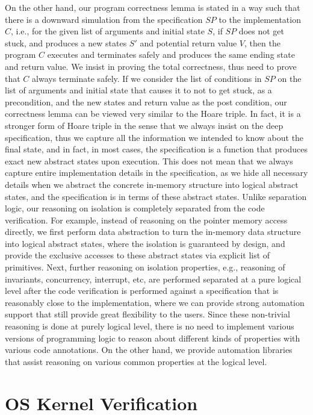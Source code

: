 On the other hand, our program correctness lemma is stated in a way such that there is a downward simulation from the specification $SP$
to the implementation $C$, i.e., for the given list of arguments and initial state $S$, if $SP$ does not get stuck, and produces a new 
states $S'$ and potential return value $V$, then the program $C$ executes and terminates safely and produces the same ending state and return value.
We insist in proving the total correctness, thus need to prove that $C$ always terminate safely.
If we consider the list of conditions in $SP$ on the list of arguments and initial state that causes it to not to get stuck, as a precondition,
and the new states and return value as the post condition, our correctness lemma can be viewed very similar to the Hoare triple.
In fact, it is a stronger form of Hoare triple in the sense that we always insist on the deep specification, thus we capture all the information
we intended to know about the final state, and in fact, in most cases, the specification is a function that produces exact new abstract states upon 
execution. This does not mean that we always capture entire implementation details in the specification, as we hide all necessary details
when we abstract the concrete in-memory structure into logical abstract states, and the specification is in terms of these abstract states.
Unlike separation logic, our reasoning on isolation is completely separated from the code verification. For example, instead of reasoning
on the pointer memory access directly, we first perform data abstraction to turn the in-memory data structure into logical abstract states,
where the isolation is guaranteed by design, and provide the exclusive accesses to these abstract states via explicit list of primitives.
Next, further reasoning on isolation properties, e.g., reasoning of invariants, concurrency, interrupt, etc, are performed separated
at a pure logical level after the code verification is performed against a specification that is reasonably close to the implementation,
where we can provide strong automation support that still provide great flexibility to the users.
Since these non-trivial reasoning is done at purely logical level, there is no need to implement various versions of programming logic
to reason about different kinds of properties with various code annotations.
On the other hand, we provide automation libraries that assist reasoning on various common properties at the logical level. 


\section{OS Kernel Verification}


